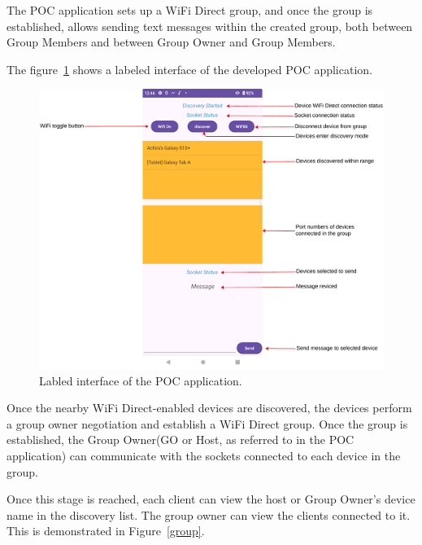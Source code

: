 The POC application sets up a WiFi Direct group, and once the group is
established, allows sending text messages within the created group, both
between Group Members and between Group Owner and Group Members.

The figure~\ref{labelewifidipoc} shows a labeled interface of the developed POC
application.

\begin{figure}[htbp]

    \centerline{\includegraphics[height=0.9\textwidth]{imgs/labledwifidipoc.png}}
    \caption{Labled interface of the POC application.}
    \label{labelewifidipoc}
\end{figure}

Once the nearby WiFi Direct-enabled devices are discovered, the devices perform
a group owner negotiation and establish a WiFi Direct group. Once the group is
established, the Group Owner(GO or Host, as referred to in the POC application)
can communicate with the sockets connected to each device in the group.

Once this stage is reached, each client can view the host or Group Owner's
device name in the discovery list. The group owner can view the clients
connected to it. This is demonstrated in Figure~\ref{group}.

